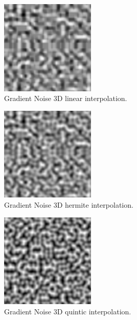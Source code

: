 \begin{figure}[h]
\centering
\includegraphics[width=0.4\textwidth]{out/noise_functions/gradient_noise3D_linearInterp.png}
\caption{Gradient Noise 3D linear interpolation.}
\label{fig:gradient_noise3D_linearInterp}
\end{figure}

\begin{figure}[h]
\centering
\includegraphics[width=0.4\textwidth]{out/noise_functions/gradient_noise3D_hermiteInterp.png}
\caption{Gradient Noise 3D hermite interpolation.}
\label{fig:gradient_noise3D_hermiteInterp}
\end{figure}

\begin{figure}[h]
\centering
\includegraphics[width=0.4\textwidth]{out/noise_functions/gradient_noise2D_quinticInterp.png}
\caption{Gradient Noise 3D quintic interpolation.}
\label{fig:gradient_noise2D_quinticInterp}
\end{figure}

